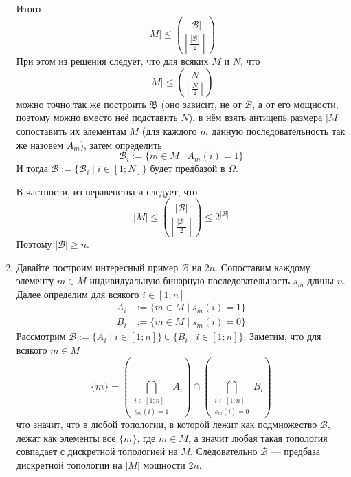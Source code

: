 \documentclass[12pt,a4paper]{article}
\begin{document}
\begin{problem}{14}
\begin{enumerate}
                Итого
                \[|M| \leqslant \binom{|\mathcal{B}|}{\left\lfloor \frac{|\mathcal{B}|}{2} \right\rfloor}\]
                При этом из решения следует, что для всяких $M$ и $N$, что
                \[|M| \leqslant \binom{N}{\left\lfloor \frac{N}{2} \right\rfloor}\]
                можно точно так же построить $\mathfrak{B}$ (оно зависит, не от $\mathcal{B}$, а от его мощности, поэтому можно вместо неё подставить $N$), в нём взять антицепь размера $|M|$ сопоставить их элементам $M$ (для каждого $m$ данную последовательность так же назовём $A_m$), затем определить
                \[
                    \mathcal{B}_i := \{m \in M \mid A_m(i) = 1\}
                \]
                И тогда $\mathcal{B} := \{\mathcal{B}_i \mid i \in [1; N]\}$ будет предбазой в $\Omega$.

                В частности, из неравенства и следует, что
                \[|M| \leqslant \binom{|\mathcal{B}|}{\left\lfloor \frac{|\mathcal{B}|}{2} \right\rfloor} \leqslant 2^{|\mathcal{B}|}\]
                Поэтому $|\mathcal{B}| \geqslant n$.

            \item Давайте построим интересный пример $\mathcal{B}$ на $2n$. Сопоставим каждому элементу $m \in M$ индивидуальную бинарную последовательность $s_m$ длины $n$. Далее определим для всякого $i \in [1; n]$
                \begin{align*}
                    A_i &:= \{m \in M \mid s_m(i) = 1\}\\
                    B_i &:= \{m \in M \mid s_m(i) = 0\}
                \end{align*}
                Рассмотрим $\mathcal{B} := \{A_i \mid i \in [1; n]\} \cup \{B_i \mid i \in [1; n]\}$. Заметим, что для всякого $m \in M$
                \[
                    \{m\} = \left(\bigcap_{\substack{i \in [1; n]\\s_m(i) = 1}} A_i\right) \cap \left(\bigcap_{\substack{i \in [1; n]\\s_m(i) = 0}} B_i\right)
                \]
                что значит, что в любой топологии, в которой лежит как подмножество $\mathcal{B}$, лежат как элементы все $\{m\}$, где $m \in M$, а значит любая такая топология совпадает с дискретной топологией на $M$. Следовательно $\mathcal{B}$ --- предбаза дискретной топологии на $|M|$ мощности $2n$.
        \end{enumerate}
    \end{problem}
\end{document}
